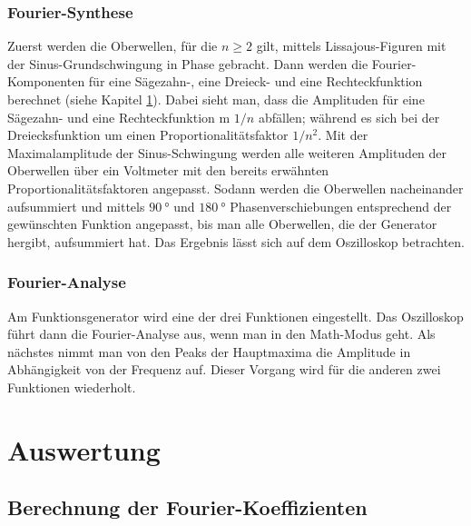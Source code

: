 \subsubsection{Fourier-Synthese}
Zuerst werden die Oberwellen, für die $n \ge 2$ gilt, mittels Lissajous-Figuren
mit der Sinus-Grundschwingung in Phase gebracht. Dann werden die Fourier-Komponenten
für eine Sägezahn-, eine Dreieck- und eine Rechteckfunktion berechnet (siehe Kapitel \ref{sec:auswertung}).
Dabei sieht man, dass die Amplituden für eine Sägezahn- und eine Rechteckfunktion m
$1/n$ abfällen; während es sich bei der Dreiecksfunktion um einen Proportionalitätsfaktor
$1/n^2$. Mit der Maximalamplitude der Sinus-Schwingung werden alle weiteren Amplituden
der Oberwellen über ein Voltmeter mit den bereits erwähnten Proportionalitätsfaktoren angepasst.
Sodann werden die Oberwellen nacheinander aufsummiert und mittels $\SI{90}{\degree}$ und
$\SI{180}{\degree}$ Phasenverschiebungen entsprechend der gewünschten Funktion angepasst,
bis man alle Oberwellen, die der Generator hergibt, aufsummiert hat. Das Ergebnis lässt
sich auf dem Oszilloskop betrachten.

\subsubsection{Fourier-Analyse}
Am Funktionsgenerator wird eine der drei Funktionen eingestellt. Das Oszilloskop
führt dann die Fourier-Analyse aus, wenn man in den Math-Modus geht. Als nächstes
nimmt man von den Peaks der Hauptmaxima die Amplitude in Abhängigkeit von der
Frequenz auf. Dieser Vorgang wird für die anderen zwei Funktionen wiederholt.

\section{Auswertung}
\label{sec:auswertung}
\subsection{Berechnung der Fourier-Koeffizienten}
\label{sec:koef}
